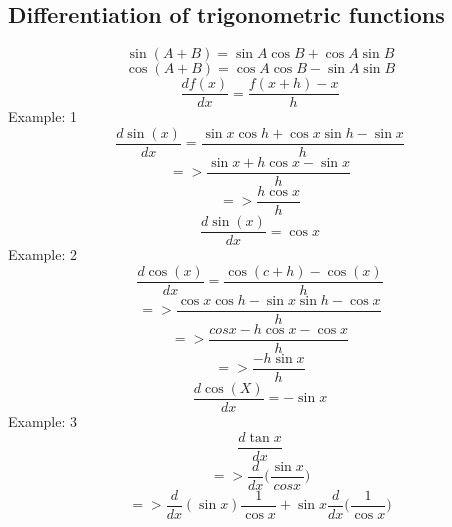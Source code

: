 	\subsection{Differentiation of trigonometric functions}
	\begin{equation}
	\sin(A+B) = \sin A\cos B+\cos A\sin B
	\end{equation}
	\begin{equation}
	\cos(A+B) = \cos A\cos B - \sin A\sin B
	\end{equation}
	\begin{equation}
	\frac{df(x)}{dx} = \frac{f(x+h)-x}{h}
	\end{equation}
	\newline
	Example: 1
	\begin{displaymath}
	\frac{d\sin(x)}{dx} = \frac{\sin x \cos h+\cos x\sin h-\sin x}{h}
	\end{displaymath}
	\begin{displaymath}
	=> \frac{\sin x + h\cos x - \sin x}{h}
	\end{displaymath}
	\begin{displaymath}
	=>\frac{h\cos x}{h}
	\end{displaymath}
	\begin{equation}
	\frac{d\sin(x)}{dx} = \cos x
	\end{equation}
	\newline
	Example: 2
	\begin{displaymath}
	\frac{d\cos(x)}{dx} = \frac{\cos(c+h)-\cos (x)}{h}
	\end{displaymath}
	\begin{displaymath}
	=> \frac{\cos x \cos h-\sin x \sin h - \cos x}{h}
	\end{displaymath}
	\begin{displaymath}
	=> \frac{cos x- h \cos x - \cos x}{h}
	\end{displaymath}
	\begin{displaymath}
	=> \frac{-h\sin x}{h}
	\end{displaymath}
	\begin{equation}
	\frac{d\cos (X)}{dx} = -\sin x
	\end{equation}
	\newline
	Example: 3
	\begin{displaymath}
	\frac{d\tan x}{dx}
	\end{displaymath}
	\begin{displaymath}
	=>\frac{d}{dx}\bigg(\frac{\sin x}{cos x}\bigg)
	\end{displaymath}
	\begin{displaymath}
	=>\frac{d}{dx}(\sin x)\frac{1}{\cos x}+\sin x \frac{d}{dx}\bigg(\frac{1}{\cos x}\bigg)
	\end{displaymath}
